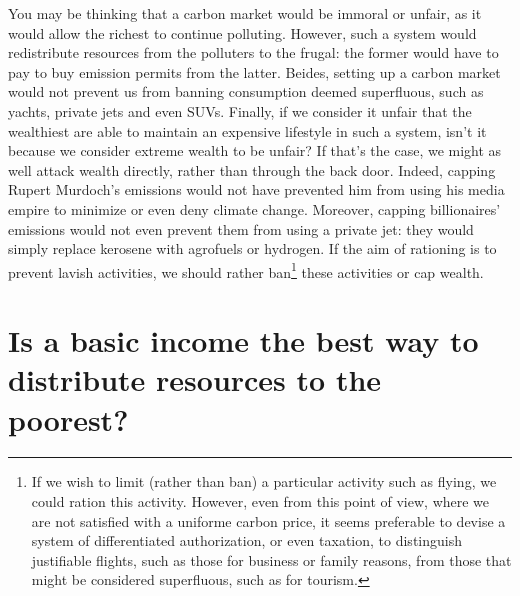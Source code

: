 \documentclass[a5paper,english,openany]{memoir}
\begin{document}
You may be thinking that a carbon market would be immoral or unfair, as it would allow the richest to continue polluting. However, such a system would redistribute resources from the %
polluters to the frugal: the former would have to pay to buy emission permits from the latter. Beides, %
setting up a carbon market would not prevent us from banning consumption deemed superfluous, such as yachts, private jets and even SUVs. Finally, if we consider it unfair that the wealthiest are able to maintain an expensive lifestyle in such a system, isn't it because we consider extreme wealth to be unfair? If that's the case, we might as well attack wealth directly, rather than through the back door. Indeed, capping Rupert Murdoch's emissions would not have prevented him from using his media empire to minimize or even deny climate change. Moreover, capping billionaires' emissions would not even prevent them from using a private jet: they would %
simply replace kerosene with agrofuels or hydrogen. If the aim of rationing is to prevent lavish activities, we should rather ban\footnote{If we wish to limit (rather than ban) a particular activity such as flying, we could ration this activity. However, even from this point of view, where we are not satisfied with a uniforme %
carbon price, it seems preferable to devise a system of differentiated authorization, %
or even taxation, %
to distinguish justifiable flights, such as those for business or family reasons, %
from those that might be considered superfluous, such as for tourism.} %
 these activities or cap wealth.  %

\section*{\normalsize Is a basic income the best way to distribute resources to the poorest?}\label{q:rdb}
\end{document}
